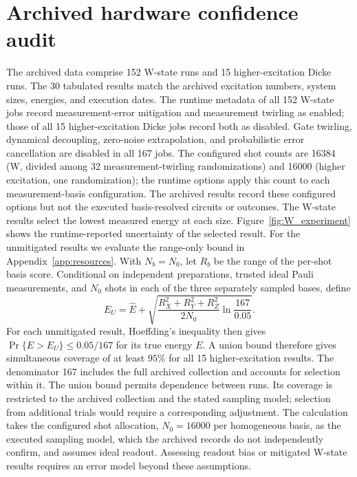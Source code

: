 \section{Archived hardware confidence audit}
\label{app:hardware-confidence}
The archived data comprise 152 W-state runs and 15 higher-excitation Dicke
runs. The 30 tabulated results match the archived excitation numbers,
system sizes, energies, and execution dates. The runtime metadata of all
152 W-state jobs record measurement-error mitigation and measurement
twirling as enabled; those of all 15 higher-excitation Dicke jobs record
both as disabled. Gate twirling, dynamical decoupling, zero-noise
extrapolation, and probabilistic error cancellation are disabled in all
167 jobs. The configured shot counts are 16384 (W, divided among 32
measurement-twirling randomizations) and 16000 (higher excitation, one
randomization); the runtime options apply this count to each
measurement-basis configuration. The archived results record these
configured options but not the executed basis-resolved circuits or
outcomes. The W-state results
select the lowest measured energy at each size. Figure~\ref{fig:W_experiment}
shows the runtime-reported uncertainty of the selected result.
For the unmitigated results we evaluate the range-only bound in
Appendix~\ref{app:resources}. With $N_b=N_0$, let $R_b$ be the range of
the per-shot basis score. Conditional on independent preparations,
trusted ideal Pauli measurements, and $N_0$ shots in each of the three
separately sampled bases, define
\begin{equation}
 E_U=\widehat E+
 \sqrt{\frac{R_X^2+R_Y^2+R_Z^2}{2N_0}\ln\frac{167}{0.05}}.
\end{equation}
For each unmitigated result, Hoeffding's inequality then gives
$\Pr\{E>E_U\}\le0.05/167$ for its true energy $E$. A union bound therefore gives simultaneous coverage
of at least $95\%$ for all 15 higher-excitation results. The denominator
167 includes the full archived collection and accounts for selection
within it. The union bound permits dependence between runs. Its coverage
is restricted to the archived collection and the stated sampling model;
selection from additional trials would require a corresponding adjustment.
The calculation takes the configured shot allocation, $N_0=16000$ per
homogeneous basis, as the executed sampling model, which the archived
records do not independently confirm, and assumes ideal readout. Assessing readout bias or mitigated W-state results requires
an error model beyond these assumptions.

